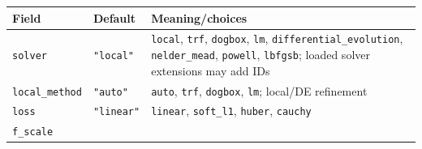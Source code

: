 \documentclass[
  10pt,
  a4paper,
  oneside]{scrreprt}
\begin{document}
\begin{longtable}[]{@{}lll@{}}
\toprule
\begin{minipage}[b]{0.30\columnwidth}\raggedright
Field\strut
\end{minipage} & \begin{minipage}[b]{0.30\columnwidth}\raggedright
Default\strut
\end{minipage} & \begin{minipage}[b]{0.30\columnwidth}\raggedright
Meaning/choices\strut
\end{minipage}\tabularnewline
\midrule
\endhead
\begin{minipage}[t]{0.30\columnwidth}\raggedright
\texttt{solver}\strut
\end{minipage} & \begin{minipage}[t]{0.30\columnwidth}\raggedright
\texttt{"local"}\strut
\end{minipage} & \begin{minipage}[t]{0.30\columnwidth}\raggedright
\texttt{local}, \texttt{trf}, \texttt{dogbox}, \texttt{lm},
\texttt{differential\_evolution}, \texttt{nelder\_mead},
\texttt{powell}, \texttt{lbfgsb}; loaded solver extensions may add
IDs\strut
\end{minipage}\tabularnewline
\begin{minipage}[t]{0.30\columnwidth}\raggedright
\texttt{local\_method}\strut
\end{minipage} & \begin{minipage}[t]{0.30\columnwidth}\raggedright
\texttt{"auto"}\strut
\end{minipage} & \begin{minipage}[t]{0.30\columnwidth}\raggedright
\texttt{auto}, \texttt{trf}, \texttt{dogbox}, \texttt{lm}; local/DE
refinement\strut
\end{minipage}\tabularnewline
\begin{minipage}[t]{0.30\columnwidth}\raggedright
\texttt{loss}\strut
\end{minipage} & \begin{minipage}[t]{0.30\columnwidth}\raggedright
\texttt{"linear"}\strut
\end{minipage} & \begin{minipage}[t]{0.30\columnwidth}\raggedright
\texttt{linear}, \texttt{soft\_l1}, \texttt{huber},
\texttt{cauchy}\strut
\end{minipage}\tabularnewline
\begin{minipage}[t]{0.30\columnwidth}\raggedright
\texttt{f\_scale}\strut
\end{minipage} & \begin{minipage}[t]{0.30\columnwidth}\raggedright

\end{minipage}
\end{longtable}
\end{document}
